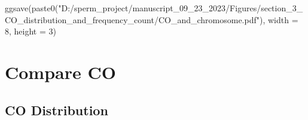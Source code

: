 \documentclass[
  letterpaper,
  DIV=11,
  numbers=noendperiod]{scrreprt}
\newenvironment{Shaded}{\begin{snugshade}}{\end{snugshade}}
\newcommand{\AttributeTok}[1]{\textcolor[rgb]{0.40,0.45,0.13}{#1}}
\newcommand{\DecValTok}[1]{\textcolor[rgb]{0.68,0.00,0.00}{#1}}
\newcommand{\FunctionTok}[1]{\textcolor[rgb]{0.28,0.35,0.67}{#1}}
\newcommand{\NormalTok}[1]{\textcolor[rgb]{0.00,0.23,0.31}{#1}}
\newcommand{\StringTok}[1]{\textcolor[rgb]{0.13,0.47,0.30}{#1}}
\begin{document}
\begin{codelisting}
\begin{Shaded}
\begin{Highlighting}[]
\FunctionTok{ggsave}\NormalTok{(}\FunctionTok{paste0}\NormalTok{(}\StringTok{"D:/sperm\_project/manuscript\_09\_23\_2023/Figures/section\_3\_CO\_distribution\_and\_frequency\_count/CO\_and\_chromosome.pdf"}\NormalTok{), }\AttributeTok{width =} \DecValTok{8}\NormalTok{, }\AttributeTok{height =} \DecValTok{3}\NormalTok{)  }
\end{Highlighting}
\end{Shaded}

\end{codelisting}


\hypertarget{compare-co}{%
\chapter{Compare CO}\label{compare-co}}

\hypertarget{co-distribution}{%
\section{CO Distribution}\label{co-distribution}}
\end{document}
